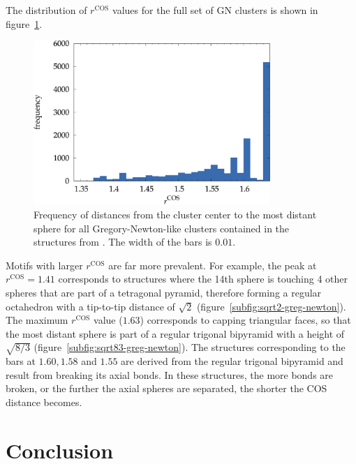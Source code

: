 The distribution of $r^\text{COS}$ values for the full set of \ac{GN} clusters
is shown in figure~\ref{fig:greg-newton}.
%
\begin{figure}
    \centering
    \includegraphics[width=0.8\textwidth]{gregory-newton/greg-newton.pdf}
    \caption{Frequency of distances from the cluster center to the most distant
    sphere for all Gregory-Newton-like clusters contained in the structures
    from \citeauthor{Holmes-Cerfon_EnumeratingRigidSphere_2016}\autocite{Holmes-Cerfon_EnumeratingRigidSphere_2016}. The width of the bars is $0.01$.}
    \label{fig:greg-newton}
\end{figure}
%
Motifs with larger $r^\text{COS}$ are far more prevalent. For example, the peak
at $r^\text{COS} = 1.41$ corresponds to structures where the 14th sphere is
touching 4 other spheres that are part of a tetragonal pyramid, therefore
forming a regular octahedron with a tip-to-tip distance of $\sqrt{2}$
(figure~\ref{subfig:sqrt2-greg-newton}).  The maximum $r^\text{COS}$ value
($1.63$) corresponds to capping triangular faces, so that the most distant
sphere is part of a regular trigonal bipyramid with a height of $\sqrt{8/3}$
(figure~\ref{subfig:sqrt83-greg-newton}). The structures corresponding to the
bars at $1.60,1.58$ and $1.55$ are derived from the regular trigonal bipyramid
and result from breaking its axial bonds. In these structures, the more bonds
are broken, or the further the axial spheres are separated, the shorter the
\ac{COS} distance becomes.

\section{Conclusion}

